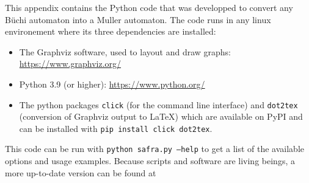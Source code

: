 This appendix contains the Python code that was developped to convert
any Büchi automaton into a Muller automaton.
The code runs in any linux environement where its three dependencies are installed:
\begin{itemize}
    \item The Graphviz software, used to layout and draw graphs: \url{https://www.graphviz.org/}
    \item Python 3.9 (or higher): \url{https://www.python.org/}
    \item The python packages \texttt{click} (for the command line interface) and \texttt{dot2tex} (conversion of Graphviz output to \LaTeX{})
        which are available on PyPI
        and can be installed with \texttt{pip install click dot2tex}.
\end{itemize}

This code can be run with \texttt{python safra.py --help} to get a list of the available options
and usage examples. Because scripts and software are living beings, a more up-to-date
version can be found at 




\newpage
\nocite{*}



